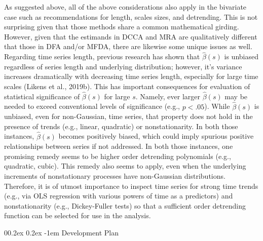 \documentclass[
  man]{apa6}
\makeatletter
\let\oldparagraph\paragraph
\renewcommand{\paragraph}[1]{\oldparagraph{#1}\mbox{}}
\renewcommand{\paragraph}{\@startsection{paragraph}{4}{\parindent}%
  {0\baselineskip \@plus 0.2ex \@minus 0.2ex}%
  {-1em}%
  {\normalfont\normalsize\bfseries\itshape\typesectitle}}
\makeatother
\begin{document}
As suggested above, all of the above considerations also apply in the
bivariate case such as recommendations for length, scales sizes, and
detrending. This is not surprising given that those methods share a
common mathematical girding. However, given that the estimands in DCCA
and MRA are qualitatively different that those in DFA and/or MFDA, there
are likewise some unique issues as well. Regarding time series length,
previous research has shown that \(\widehat{\beta}(s)\) is unbiased
regardless of series length and underlying distribution; however, it's
variance increases dramatically with decreasing time series length,
especially for large time scales (Likens et al., 2019b). This has important
consequences for evaluation of statistical significance of
\(\widehat{\beta}(s)\) for large \(s\). Namely, ever larger
\(\widehat{\beta}(s)\) may be needed to exceed conventional levels of
significance (e.g., \(p<.05\)). While \(\widehat{\beta}(s)\) is unbiased,
even for non-Gaussian, time series, that property does not hold in the
presence of trends (e.g., linear, quadratic) or nonstationarity. In both
those instances, \(\widehat{\beta}(s)\) becomes positively biased, which
could imply spurious positive relationships between series if not
addressed. In both those instances, one promising remedy seems to be
higher order detrending polynomials (e.g., quadratic, cubic). This
remedy also seems to apply, even when the underlying increments of
nonstationary processes have non-Gaussian distributions. Therefore, it
is of utmost importance to inspect time series for strong time trends
(e.g., via OLS regression with various powers of time as a predictors)
and nonstationarity (e.g., Dickey-Fuller tests) so that a sufficient
order detrending function can be selected for use in the analysis.

\hypertarget{development-plan}{%
\paragraph{Development Plan}\label{development-plan}}
\end{document}
